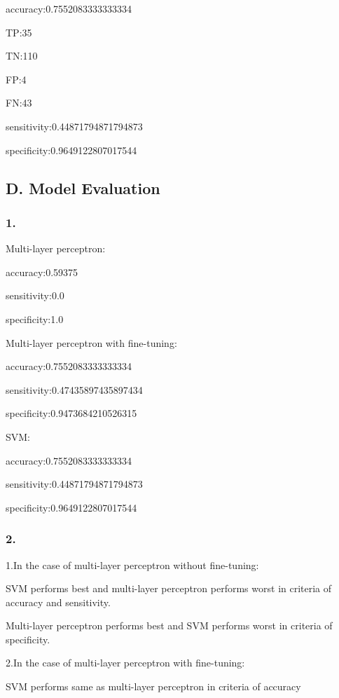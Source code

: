 \documentclass{article}
\begin{document}
accuracy:0.7552083333333334

TP:35

TN:110

FP:4

FN:43

sensitivity:0.44871794871794873

specificity:0.9649122807017544

\subsection{D. Model Evaluation}

\subsubsection{1.}

Multi-layer perceptron:

accuracy:0.59375

sensitivity:0.0

specificity:1.0

\bigskip

Multi-layer perceptron with fine-tuning:

accuracy:0.7552083333333334

sensitivity:0.47435897435897434

specificity:0.9473684210526315

\bigskip

SVM:

accuracy:0.7552083333333334

sensitivity:0.44871794871794873

specificity:0.9649122807017544

\subsubsection{2.}

1.In the case of multi-layer perceptron without fine-tuning:

SVM performs best and multi-layer perceptron performs worst in criteria of accuracy and sensitivity.

Multi-layer perceptron performs best and SVM performs worst in criteria of specificity.

\bigskip

2.In the case of multi-layer perceptron with fine-tuning:

SVM performs same as multi-layer perceptron in criteria of accuracy
\end{document}
